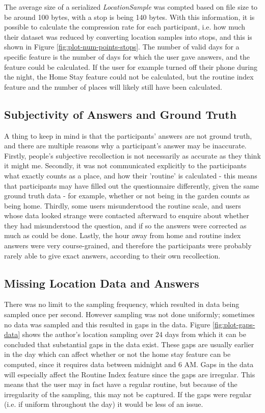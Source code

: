 The average size of a serialized \textit{LocationSample} was compted based on file size to be around 100 bytes, with a stop is being 140 bytes. With this information, it is possible to calculate the compression rate for each participant, i.e. how much their dataset was reduced by converting location samples into stops, and this is shown in Figure \ref{fig:plot-num-points-stops}. The number of valid days for a specific feature is the number of days for which the user gave answers, and the feature could be calculated. If the user for example turned off their phone during the night, the Home Stay feature could not be calculated, but the routine index feature and the number of places will likely still have been calculated.

\subsection{Subjectivity of Answers and Ground Truth}
A thing to keep in mind is that the participants' answers are not ground truth, and there are multiple reasons why a participant's answer may be inaccurate. Firstly, people's subjective recollection is not necessarily as accurate as they think it might me. Secondly, it was not communicated explicitly to the participants what exactly counts as a place, and how their 'routine' is calculated - this means that participants may have filled out the questionnaire differently, given the same ground truth data - for example, whether or not being in the garden counts as being home. Thirdly, some users misunderstood the routine scale, and users whose data looked strange were contacted afterward to enquire about whether they had misunderstood the question, and if so the answers were corrected as much as could be done. Lastly, the hour away from home and routine index answers were very course-grained, and therefore the participants were probably rarely able to give exact answers, according to their own recollection. 

\subsection{Missing Location Data and Answers}
There was no limit to the sampling frequency, which resulted in data being sampled once per second. However sampling was not done uniformly; sometimes no data was sampled and this resulted in gaps in the data. Figure \ref{fig:plot-gaps-data} shows the author's location sampling over 24 days from which it can be concluded that substantial gaps in the data exist. These gaps are usually earlier in the day which can affect whether or not the home stay feature can be computed, since it requires data between midnight and 6 AM. Gaps in the data will especially affect the Routine Index feature since the gaps are irregular. This means that the user may in fact have a regular routine, but because of the irregularity of the sampling, this may not be captured. If the gaps were regular (i.e. if uniform throughout the day) it would be less of an issue.\\


